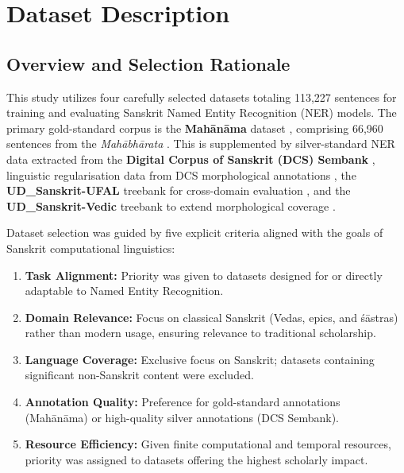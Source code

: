 
\chapter{Dataset Description}
\label{chap:dataset}

\section{Overview and Selection Rationale}
\label{sec:overview}

This study utilizes four carefully selected datasets totaling 113,227 sentences for training and evaluating Sanskrit Named Entity Recognition (NER) models. The primary gold-standard corpus is the \textbf{Mahānāma} dataset \cite{sarkar2025mahanama}, comprising 66,960 sentences from the \textit{Mahābhārata} \cite{mahabharata}. This is supplemented by silver-standard NER data extracted from the \textbf{Digital Corpus of Sanskrit (DCS) Sembank} \cite{hellwig2025sembank}, linguistic regularisation data from DCS morphological annotations \cite{hellwig2010dcs}, the \textbf{UD\_Sanskrit-UFAL} treebank for cross-domain evaluation \cite{zeman2023ud}, and the \textbf{UD\_Sanskrit-Vedic} treebank to extend morphological coverage \cite{hellwig2020vedictreebank}.

Dataset selection was guided by five explicit criteria aligned with the goals of Sanskrit computational linguistics:

\begin{enumerate}
    \item \textbf{Task Alignment:} Priority was given to datasets designed for or directly adaptable to Named Entity Recognition.
    \item \textbf{Domain Relevance:} Focus on classical Sanskrit (Vedas, epics, and śāstras) rather than modern usage, ensuring relevance to traditional scholarship.
    \item \textbf{Language Coverage:} Exclusive focus on Sanskrit; datasets containing significant non-Sanskrit content were excluded.
    \item \textbf{Annotation Quality:} Preference for gold-standard annotations (Mahānāma) or high-quality silver annotations (DCS Sembank).
    \item \textbf{Resource Efficiency:} Given finite computational and temporal resources, priority was assigned to datasets offering the highest scholarly impact.
\end{enumerate}

